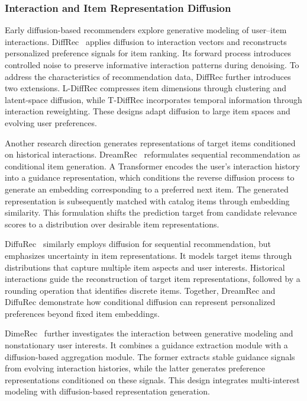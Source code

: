 \documentclass[sigconf,nonacm]{acmart}
\begin{document}
\subsubsection{Interaction and Item Representation Diffusion}

Early diffusion-based recommenders explore generative
modeling of user--item interactions. DiffRec~\cite{diffrec}
applies diffusion to interaction vectors and reconstructs
personalized preference signals for item ranking.
Its forward process introduces controlled noise to
preserve informative interaction patterns during
denoising. To address the characteristics of
recommendation data, DiffRec further introduces
two extensions. L-DiffRec compresses item dimensions
through clustering and latent-space diffusion,
while T-DiffRec incorporates temporal information
through interaction reweighting. These designs
adapt diffusion to large item spaces and evolving
user preferences.

Another research direction generates representations
of target items conditioned on historical interactions.
DreamRec~\cite{dreamrec} reformulates sequential
recommendation as conditional item generation.
A Transformer encodes the user's interaction history
into a guidance representation, which conditions the
reverse diffusion process to generate an embedding
corresponding to a preferred next item. The generated
representation is subsequently matched with catalog
items through embedding similarity. This formulation
shifts the prediction target from candidate relevance
scores to a distribution over desirable item
representations.

DiffuRec~\cite{diffurec} similarly employs diffusion
for sequential recommendation, but emphasizes
uncertainty in item representations. It models
target items through distributions that capture
multiple item aspects and user interests.
Historical interactions guide the reconstruction
of target item representations, followed by a
rounding operation that identifies discrete items.
Together, DreamRec and DiffuRec demonstrate how
conditional diffusion can represent personalized
preferences beyond fixed item embeddings.

DimeRec~\cite{dime} further investigates the
interaction between generative modeling and
nonstationary user interests. It combines a
guidance extraction module with a diffusion-based
aggregation module. The former extracts stable
guidance signals from evolving interaction
histories, while the latter generates preference
representations conditioned on these signals.
This design integrates multi-interest modeling
with diffusion-based representation generation.
\end{document}
